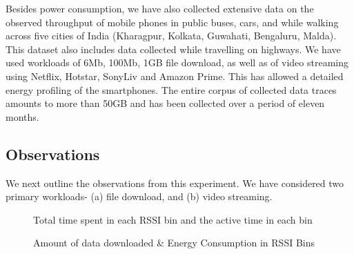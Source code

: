 Besides power consumption, we have also collected extensive data on the observed throughput of mobile phones in public buses, cars, and while walking across five cities of India (Kharagpur, Kolkata, Guwahati, Bengaluru, Malda). This dataset also includes data collected while travelling on highways. We have used workloads of 6Mb, 100Mb, 1GB file download, as well as of video streaming using Netflix, Hotstar, SonyLiv and Amazon Prime. This has allowed a detailed energy profiling of the smartphones. The entire corpus of collected data traces amounts to more than 50GB and has been collected over a period of eleven months.

\subsection{Observations}
We next outline the observations from this experiment. We have considered two primary workloads- (a) file download, and (b) video streaming. \\
\begin{figure}[h]
    \centering
    \caption{Total time spent in each \acs{RSSI} bin and the active time in each bin}
    \label{fig:chap03s3:vid_time}
\end{figure}
\begin{figure}[h]
    \centering
    \caption{Amount of data downloaded \& Energy Consumption in \acs{RSSI} Bins}
    \label{fig:chap03s3:vid_thpt}
\end{figure}
